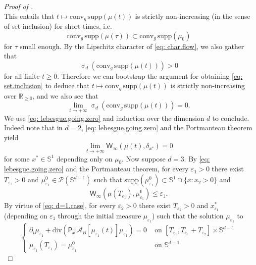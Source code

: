 \documentclass[a4paper,11pt]{article}
\theoremstyle{plain}
\newcommand{\supp}{\mathrm{supp}}
\newcommand{\proj}{\bm{\mathsf{P}}^\perp}
\newcommand{\conv}{\mathrm{conv}}
\newcommand{\dive}{\mathrm{div}}
\renewcommand{\S}{\mathbb{S}^{d-1}}
\newcommand{\bB}{\bm{\mathit{B}}}
\renewcommand{\leq}{\leqslant}
\renewcommand{\geq}{\geqslant}
\numberwithin{equation}{section}
\begin{document}
\begin{proof}[Proof of ]
\begin{equation*}
\end{equation*}
This entails that $t\mapsto \conv_g\,\supp(\mu(t))$ is strictly non-increasing (in the sense of set inclusion) for short times, i.e.
\begin{equation}\label{eq: set.inclusion}
        \conv_g\,\supp(\mu(\tau))\subset \conv_g\,\supp(\mu_0)
\end{equation}
for $\tau$ small enough. By the Lipschitz character of \eqref{eq: char.flow}, we also gather that 
$$\upsigma_d(\conv_g\,\supp(\mu(t)))>0$$
for all finite $t\geq 0$.
Therefore we can bootstrap the argument for obtaining \eqref{eq: set.inclusion} to deduce that $t\mapsto \conv_g\,\supp(\mu(t))$ is strictly non-increasing over $\mathbb{R}_{\geq 0}$, and we also see that 
\begin{equation}\label{eq: lebesgue.going.zero}
\lim_{t\to+\infty}\upsigma_d(\conv_g\,\supp(\mu(t)))=0. 
\end{equation}
We use \eqref{eq: lebesgue.going.zero} and induction over the dimension $d$ to conclude. Indeed note that in $d=2$, \eqref{eq: lebesgue.going.zero} and the Portmanteau theorem yield
\begin{equation} \label{eq: d=1.case}
    \lim_{t\to +\infty}\mathsf{W}_\infty(\mu(t),\delta_{x^*})=0
\end{equation}
for some $x^*\in \mathbb{S}^1$ depending only on $\mu_0$. 
Now suppose $d=3$. By \eqref{eq: lebesgue.going.zero} and the Portmanteau theorem, for every $\varepsilon_1>0$ there exist $T_{\varepsilon_1}>0$ and $\mu_{\varepsilon_1}^0\in \mathscr{P}(\mathbb{S}^{d-1})$ such that $   \supp(\mu_{\varepsilon_1}^0)\subset \mathbb{S}^1\cap \{x\colon x_2>0\}$ and
\begin{equation} \label{eq: first.winfty}
\mathsf{W}_{\infty}\left(\mu(T_{\varepsilon_1}),\mu_{\varepsilon_1}^0\right)\leq \varepsilon_1.
\end{equation}
By virtue of \eqref{eq: d=1.case}, for every $\varepsilon_2>0$ there exist $T_{\varepsilon_2}>0$ and $x^*_{\varepsilon_1}$ (depending on $\varepsilon_1$ through the initial measure $\mu_{\varepsilon_1}$) such that the solution $\mu_{\varepsilon_1}$ to
\begin{equation*}
\begin{cases}
\partial_t\mu_{\varepsilon_1}+\dive\left(\proj_x\mathscr{A}_{\bB}[\mu_{\varepsilon_1}(t)]\mu_{\varepsilon_1}\right)=0 &\text{ on } [T_{\varepsilon_1},T_{\varepsilon_1}+T_{\varepsilon_2}]\times \mathbb{S}^{d-1}\\
    \mu_{\varepsilon_1}(T_{\varepsilon_1})=\mu_{\varepsilon_1}^0 &\text{ on } \S

\end{cases}
\end{equation*}
\end{proof}
\end{document}
